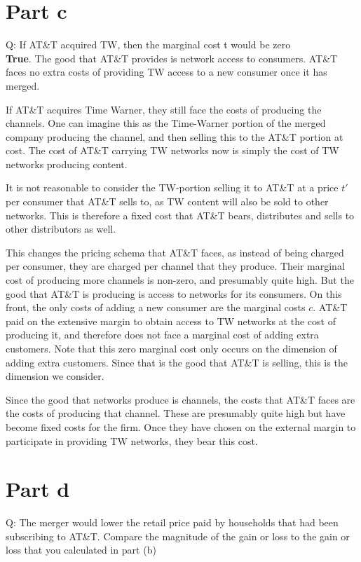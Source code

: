 \documentclass[12pt]{paper}
\begin{document}
\section*{Part c}

Q: If AT\&T acquired TW, then the marginal cost t would be zero
\\

\textbf{True}. The good that AT\&T provides is network access to
consumers. AT\&T faces no extra costs of providing TW access to a new
consumer once it has merged.


If AT\&T acquires Time Warner, they still face the
costs of producing the channels. One can imagine this as the
Time-Warner portion of the merged company producing the channel, and
then selling this to the AT\&T portion at cost. The cost of AT\&T
carrying TW networks now is simply the cost of TW networks producing
content.


It is not reasonable to consider the TW-portion selling it to AT\&T at
a price $t'$ per consumer that AT\&T sells to, as TW content will also
be sold to other networks. This is therefore a fixed cost that AT\&T
bears, distributes and sells to other distributors as well.


This changes the pricing schema that AT\&T faces, as instead of being
charged per consumer, they are charged per channel that they
produce. Their marginal cost of producing more channels is non-zero,
and presumably quite high. But the good that AT\&T is producing is
access to networks for its consumers. On this front, the only costs of
adding a new consumer are the marginal costs $c$. AT\&T paid on the
extensive margin to obtain access to TW networks at the cost of
producing it, and therefore does not face a marginal cost of adding
extra customers. Note that this zero marginal cost only occurs on the
dimension of adding extra customers. Since that is the good that AT\&T
is selling, this is the dimension we consider.


Since the good that networks produce is channels, the costs
that AT\&T faces are the costs of producing that channel. These are
presumably quite high but have become fixed costs for the firm. Once
they have chosen on the external margin to participate in providing TW
networks, they bear this cost.

\section*{Part d}

Q: The merger would lower the retail price paid by
  households  that had been subscribing to AT\&T.
  Compare the magnitude of the gain or loss to the
  gain or loss that you calculated in part (b)
\\
\end{document}
